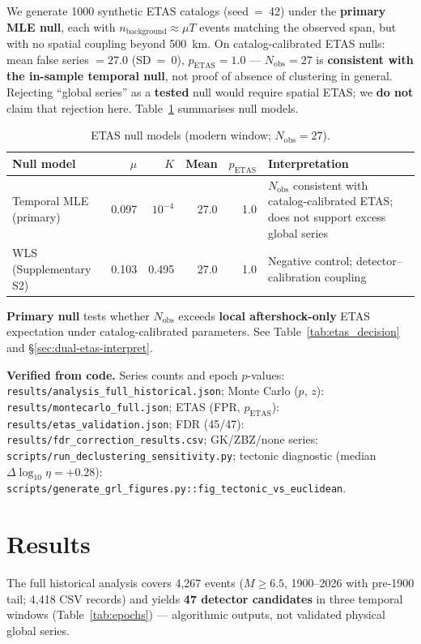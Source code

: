 \documentclass[draft]{agujournal2019}
\begin{document}
We generate 1000 synthetic ETAS catalogs (seed~=~42) under the
\textbf{primary MLE null}, each with
$n_\mathrm{background} \approx \mu T$ events matching the observed span,
but with no spatial coupling beyond 500~km.
On catalog-calibrated ETAS nulls: mean false series $= 27.0$ (SD~=~0),
$p_\mathrm{ETAS} = 1.0$ --- $N_\mathrm{obs}=27$ is \textbf{consistent with the
in-sample temporal null}, not proof of absence of clustering in general.
Rejecting ``global series'' as a \textbf{tested} null would require spatial ETAS;
we \textbf{do not} claim that rejection here.
Table~\ref{tab:etas_primary} summarises null models.

\begin{table}[htbp]
\centering
\caption{ETAS null models (modern window; $N_\mathrm{obs}=27$).}
\label{tab:etas_primary}
\begin{tabular}{lrrrrp{4.0cm}}
\hline
Null model & $\mu$ & $K$ & Mean & $p_\mathrm{ETAS}$ & Interpretation \\
\hline
Temporal MLE (primary) & 0.097 & $10^{-4}$ & 27.0 & 1.0 &
  $N_\mathrm{obs}$ consistent with catalog-calibrated ETAS; does not support
  excess global series \\
WLS (Supplementary S2) & 0.103 & 0.495 & 27.0 & 1.0 &
  Negative control; detector--calibration coupling \\
\hline
\end{tabular}
\end{table}

\noindent\textbf{Primary null} tests whether $N_\mathrm{obs}$ exceeds
\textbf{local aftershock-only} ETAS expectation under catalog-calibrated parameters.
See Table~\ref{tab:etas_decision} and \S\ref{sec:dual-etas-interpret}.

\noindent\textbf{Verified from code.}
Series counts and epoch $p$-values: \texttt{results/analysis\_full\_historical.json};
Monte Carlo ($p$, $z$): \texttt{results/montecarlo\_full.json};
ETAS (FPR, $p_\mathrm{ETAS}$): \texttt{results/etas\_validation.json};
FDR (45/47): \texttt{results/fdr\_correction\_results.csv};
GK/ZBZ/none series: \texttt{scripts/run\_declustering\_sensitivity.py};
tectonic diagnostic (median $\Delta\log_{10}\eta = +0.28$):
\texttt{scripts/generate\_grl\_figures.py::fig\_tectonic\_vs\_euclidean}.

\section{Results}
\label{sec:results}

The full historical analysis covers 4{,}267 events ($M \ge 6.5$, 1900--2026 with
pre-1900 tail; 4{,}418 CSV records) and yields \textbf{47 detector candidates}
in three temporal windows (Table~\ref{tab:epochs}) --- algorithmic outputs,
not validated physical global series.
\end{document}
